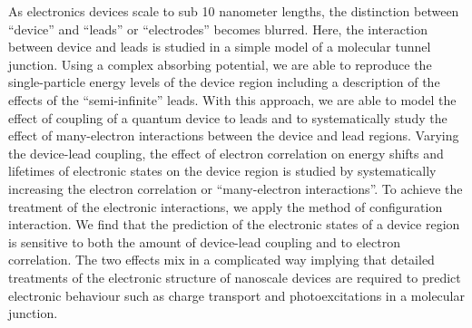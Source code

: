 As electronics devices scale to sub 10 nanometer lengths, the distinction
between ``device'' and ``leads'' or ``electrodes'' becomes blurred. Here, the
interaction between device and leads is studied in a simple model of a
molecular tunnel junction. Using a complex absorbing potential, we are able to
reproduce the single-particle energy levels of the device region including a
description of the effects of the ``semi-infinite'' leads. With this approach,
we are able to model the effect of coupling of a quantum device to leads and to
systematically study the effect of many-electron interactions between the
device and lead regions. Varying the device-lead coupling, the effect of
electron correlation on energy shifts and lifetimes of electronic states on the
device region is studied by systematically increasing the electron correlation
or ``many-electron interactions''. To achieve the treatment of the electronic
interactions, we apply the method of configuration interaction. We find that
the prediction of the electronic states of a device region is sensitive to both
the amount of device-lead coupling and to electron correlation. The two effects
mix in a complicated way implying that detailed treatments of the electronic
structure of nanoscale devices are required to predict electronic behaviour
such as charge transport and photoexcitations in a molecular junction.
